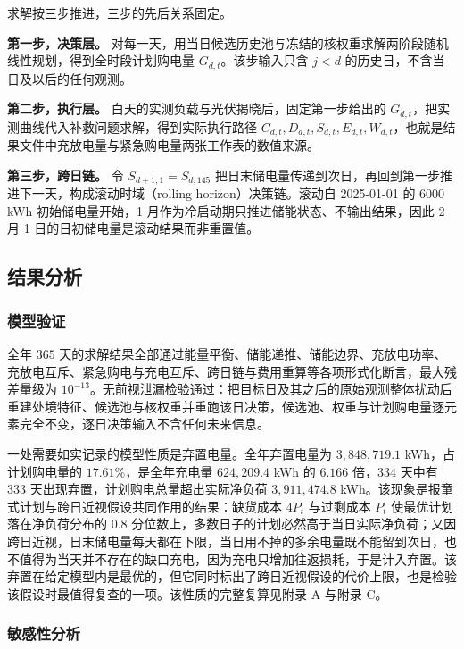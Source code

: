 求解按三步推进，三步的先后关系固定。

\textbf{第一步，决策层。} 对每一天，用当日候选历史池与冻结的核权重求解两阶段随机线性规划，得到全时段计划购电量 $G_{d,t}$。该步输入只含 $j<d$ 的历史日，不含当日及以后的任何观测。

\textbf{第二步，执行层。} 白天的实测负载与光伏揭晓后，固定第一步给出的 $G_{d,t}$，把实测曲线代入补救问题求解，得到实际执行路径 $C_{d,t},D_{d,t},S_{d,t},E_{d,t},W_{d,t}$，也就是结果文件中充放电量与紧急购电量两张工作表的数值来源。

\textbf{第三步，跨日链。} 令 $S_{d+1,1}=S_{d,145}$ 把日末储电量传递到次日，再回到第一步推进下一天，构成滚动时域（rolling horizon）决策链\cite{palma}。滚动自 2025-01-01 的 $6000$ kWh 初始储电量开始，1 月作为冷启动期只推进储能状态、不输出结果，因此 2 月 1 日的日初储电量是滚动结果而非重置值。

\subsection{结果分析}

\subsubsection{模型验证}

全年 $365$ 天的求解结果全部通过能量平衡、储能递推、储能边界、充放电功率、充放电互斥、紧急购电与充电互斥、跨日链与费用重算等各项形式化断言，最大残差量级为 $10^{-13}$。无前视泄漏检验通过：把目标日及其之后的原始观测整体扰动后重建处境特征、候选池与核权重并重跑该日决策，候选池、权重与计划购电量逐元素完全不变，逐日决策输入不含任何未来信息。

一处需要如实记录的模型性质是弃置电量。全年弃置电量为 $3{,}848{,}719.1$ kWh，占计划购电量的 $17.61\%$，是全年充电量 $624{,}209.4$ kWh 的 $6.166$ 倍，$334$ 天中有 $333$ 天出现弃置，计划购电总量超出实际净负荷 $3{,}911{,}474.8$ kWh。该现象是报童式计划与跨日近视假设共同作用的结果：缺货成本 $4P_t$ 与过剩成本 $P_t$ 使最优计划落在净负荷分布的 $0.8$ 分位数上，多数日子的计划必然高于当日实际净负荷；又因跨日近视，日末储电量每天都在下限，当日用不掉的多余电量既不能留到次日，也不值得为当天并不存在的缺口充电，因为充电只增加往返损耗，于是计入弃置。该弃置在给定模型内是最优的，但它同时标出了跨日近视假设的代价上限，也是检验该假设时最值得复查的一项。该性质的完整复算见附录 A 与附录 C。

\subsubsection{敏感性分析}

